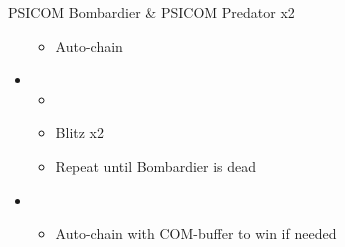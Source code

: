 \begin{multicols}{2}
\begin{battle}{PSICOM Bombardier \& PSICOM Predator x2}
\begin{itemize}
\begin{itemize}
              \item Auto-chain
            \end{itemize}
      \item \first
            \begin{itemize}
              \item \stagger
              \item Blitz x2
              \item Repeat until Bombardier is dead
            \end{itemize}
      \item \second
            \begin{itemize}
              \item Auto-chain with COM-buffer to win if needed
            \end{itemize}
    \end{itemize}
     
  \end{battle}

  \vfill


\end{multicols}
